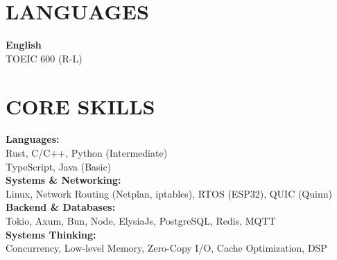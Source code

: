 \documentclass[10pt,a4paper]{article}
\begin{document}
\begin{minipage}[t]{0.30\textwidth}
    \vspace{0.25cm}
    \section*{LANGUAGES}
    \textbf{English} \\
    TOEIC 600 (R-L)

    \vspace{0.25cm}
    \section*{CORE SKILLS}
    \textbf{Languages:} \\
    Rust, C/C++, Python (Intermediate) \\
    TypeScript, Java (Basic) \\[0.15cm]
    \textbf{Systems \& Networking:} \\
    Linux, Network Routing (Netplan, iptables), RTOS (ESP32), QUIC (Quinn) \\[0.15cm]
    \textbf{Backend \& Databases:} \\
    Tokio, Axum, Bun, Node, ElysiaJs, PostgreSQL, Redis, MQTT \\[0.15cm]
    \textbf{Systems Thinking:} \\
    Concurrency, Low-level Memory, Zero-Copy I/O, Cache Optimization, DSP

\end{minipage}%
\hfill{\color{lightgray}\vrule}\hfill%
\end{document}
